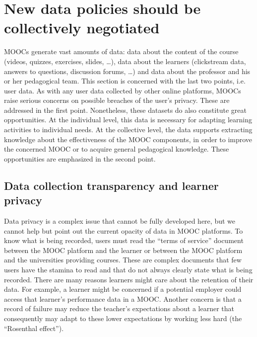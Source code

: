 \section{New data policies should be collectively negotiated}

MOOCs generate vast amounts of data: data about the content of the
course (videos, quizzes, exercises, slides, \ldots), data about the
learners
(clickstream data, answers to questions, discussion forums, \ldots) and data
about the professor and his or her pedagogical team. This section is
concerned with the last two points, i.e. user data.  As with any user data
collected by other online platforms, MOOCs raise serious concerns on
possible breaches of the user's privacy. These are addressed in the
first point. Nonetheless, these datasets do also constitute great
opportunities. At the individual level, this data is necessary for
adapting learning activities to individual needs. At the collective
level, the data supports extracting knowledge about the effectiveness of
the MOOC components, in order to improve the concerned MOOC or to
acquire general pedagogical knowledge. These opportunities are
emphasized in the second point.
        

\subsection{Data collection transparency and learner privacy}

Data privacy is a complex issue that cannot be fully developed here, but
we cannot help but point out the current opacity of data in MOOC
platforms.  To know what is being recorded, users must read the
``terms of service'' document between the MOOC platform and the learner
or between the MOOC platform and the
universities providing courses. 
These are complex documents that few users have the stamina to read
and that do not always clearly state what is being recorded. 
There are many reasons learners might care about the retention of their
data.
For example, a learner might be concerned if a potential employer
could access that learner's performance data in a MOOC.
Another concern is that a record of
failure may reduce the teacher's expectations about a learner
that consequently may adapt to these lower expectations by
working less hard (the ``Rosenthal effect'').

